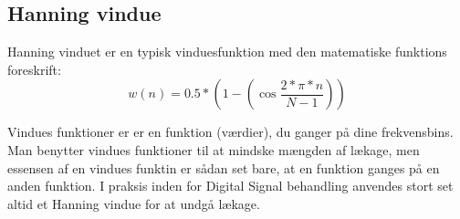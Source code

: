 \subsection{Hanning vindue}
Hanning vinduet er en typisk vinduesfunktion med den matematiske funktions foreskrift:
\begin{equation}\label{eq:Hanning}
{w(n)} ={0.5*(1-(\cos \frac{2*\pi*n}{N-1}))}
\end{equation}


Vindues funktioner er er en funktion (værdier), du ganger på dine frekvensbins. Man benytter vindues funktioner til at mindske mængden af lækage, men essensen af en vindues funktin er sådan set bare, at en funktion ganges på en anden funktion. I praksis inden for Digital Signal behandling anvendes stort set altid et Hanning vindue for at undgå lækage.
